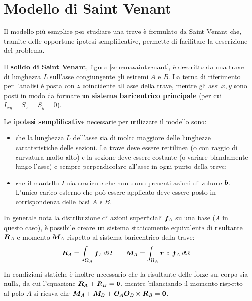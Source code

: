 \chapter{Modello di Saint Venant}
	Il modello più semplice per studiare una trave è formulato da Saint Venant che, tramite delle opportune ipotesi semplificative, permette di facilitare la descrizione del problema.
	
	
	\begin{concetto}
		Il \textbf{solido di Saint Venant}, figura \ref{schemasaintvenant}, è descritto da una trave di lunghezza $L$ sull'asse congiungente gli estremi $A$ e $B$. La terna di riferimento per l'analisi è posta con $z$ coincidente all'asse della trave, mentre gli assi $x,y$ sono posti in modo da formare un \textbf{sistema baricentrico principale} (per cui $I_{xy} = S_x = S_y = 0$).
		
		Le \textbf{ipotesi semplificative} necessarie per utilizzare il modello sono:
		\begin{itemize}
			\item che la lunghezza $L$ dell'asse sia di molto maggiore delle lunghezze caratteristiche delle sezioni. La trave deve essere rettilinea (o con raggio di curvatura molto alto) e la sezione deve essere costante (o variare blandamente lungo l'asse) e sempre perpendicolare all'asse in ogni punto della trave;
			\item che il mantello $\Gamma$ sia scarico e che non siano presenti azioni di volume $\boldsymbol{b}$. L'unico carico esterno che può essere applicato deve essere posto in corrispondenza delle basi $A$ e $B$.
		\end{itemize}
	\end{concetto}

	In generale nota la distribuzione di azioni superficiali $\boldsymbol{f}_A$ su una base ($A$ in questo caso), è possibile creare un sistema staticamente equivalente di risultante $\boldsymbol{R}_A$ e momento $\boldsymbol{M}_A$ rispetto al sistema baricentrico della trave:
	\[ \boldsymbol{R}_A= \int_{\Omega_A} \boldsymbol{f}_A\, d\Omega \qquad \boldsymbol{M}_A = \int_{\Omega_A} \boldsymbol{r} \times \boldsymbol{f}_A\, d\Omega \]
	
	In condizioni statiche è inoltre necessario che la risultante delle forze sul corpo sia nulla, da cui l'equazione $\boldsymbol{R}_A + \boldsymbol{R}_B=  \boldsymbol{0}$, mentre bilanciando il momento rispetto al polo $A$ si ricava che $\boldsymbol{M}_A + \boldsymbol{M}_B + \boldsymbol{O}_A\boldsymbol{O}_B \times \boldsymbol{R}_B = \boldsymbol{0}$.
	
